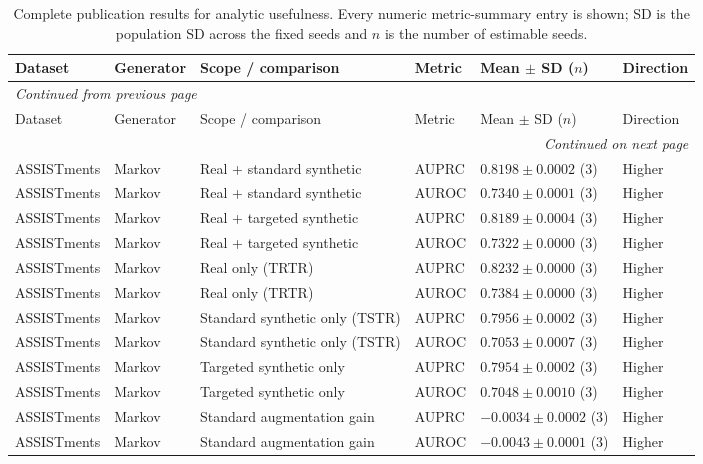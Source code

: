 \scriptsize
\setlength{\tabcolsep}{3pt}
\begin{longtable}{@{}p{2.25cm}p{2.05cm}p{4.7cm}p{5.0cm}p{2.6cm}p{1.25cm}@{}}
\caption{Complete publication results for analytic usefulness. Every numeric metric-summary entry is shown; SD is the population SD across the fixed seeds and $n$ is the number of estimable seeds.}\label{tab:supp-analytic-usefulness}\\
\toprule
Dataset & Generator & Scope / comparison & Metric & Mean $\pm$ SD ($n$) & Direction \\
\midrule
\endfirsthead
\multicolumn{6}{l}{\textit{Continued from previous page}}\\
\toprule
Dataset & Generator & Scope / comparison & Metric & Mean $\pm$ SD ($n$) & Direction \\
\midrule
\endhead
\midrule
\multicolumn{6}{r}{\textit{Continued on next page}}\\
\endfoot
\bottomrule
\endlastfoot
ASSISTments & Markov & Real + standard synthetic & AUPRC & $0.8198 \mathbin{\pm} 0.0002$ (3) & Higher \\
ASSISTments & Markov & Real + standard synthetic & AUROC & $0.7340 \mathbin{\pm} 0.0001$ (3) & Higher \\
ASSISTments & Markov & Real + targeted synthetic & AUPRC & $0.8189 \mathbin{\pm} 0.0004$ (3) & Higher \\
ASSISTments & Markov & Real + targeted synthetic & AUROC & $0.7322 \mathbin{\pm} 0.0000$ (3) & Higher \\
ASSISTments & Markov & Real only (TRTR) & AUPRC & $0.8232 \mathbin{\pm} 0.0000$ (3) & Higher \\
ASSISTments & Markov & Real only (TRTR) & AUROC & $0.7384 \mathbin{\pm} 0.0000$ (3) & Higher \\
ASSISTments & Markov & Standard synthetic only (TSTR) & AUPRC & $0.7956 \mathbin{\pm} 0.0002$ (3) & Higher \\
ASSISTments & Markov & Standard synthetic only (TSTR) & AUROC & $0.7053 \mathbin{\pm} 0.0007$ (3) & Higher \\
ASSISTments & Markov & Targeted synthetic only & AUPRC & $0.7954 \mathbin{\pm} 0.0002$ (3) & Higher \\
ASSISTments & Markov & Targeted synthetic only & AUROC & $0.7048 \mathbin{\pm} 0.0010$ (3) & Higher \\
ASSISTments & Markov & Standard augmentation gain & AUPRC & $-0.0034 \mathbin{\pm} 0.0002$ (3) & Higher \\
ASSISTments & Markov & Standard augmentation gain & AUROC & $-0.0043 \mathbin{\pm} 0.0001$ (3) & Higher \\

\end{longtable}

